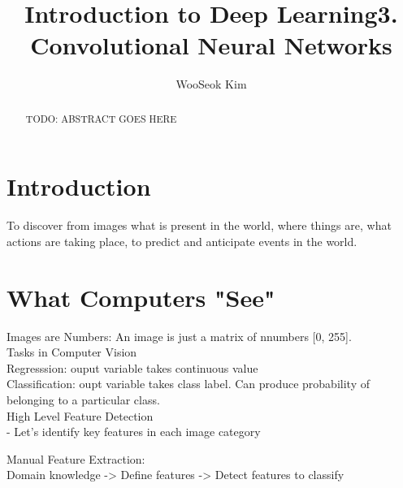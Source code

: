 \documentclass{article}
\title{Introduction to Deep Learning}
\title{3. Convolutional Neural Networks}
\author{WooSeok Kim}
\begin{document}
\maketitle

\begin{abstract}
    TODO: ABSTRACT GOES HERE
\end{abstract}

\section{Introduction}
To discover from images what is present in the world, where things are, what actions are taking place, to predict and anticipate events in the world. \\

\section{What Computers "See"}
Images are Numbers: An image is just a matrix of nnumbers [0, 255]. \\ 
Tasks in Computer Vision \\
Regresssion: ouput variable takes continuous value \\
Classification: oupt variable takes class label. Can produce probability of belonging to a particular class. \\

High Level Feature Detection\\
- Let's identify key features in each image category

Manual Feature Extraction: \\
Domain knowledge -> Define features -> Detect features to classify\\
\end{document}
